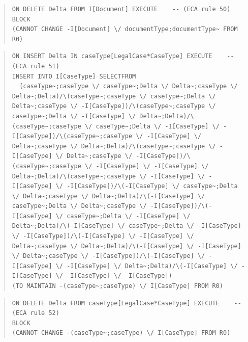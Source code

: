 \documentclass[10pt,a4paper]{report}              %
\theoremstyle{plain}\theorembodyfont{\rmfamily}\newtheorem{definition}{Definition}[section]
\theoremstyle{plain}\theorembodyfont{\rmfamily}\newtheorem{designrule}[definition]{Requirement}
\begin{document}
\begin{quote}
\begin{verbatim}
ON DELETE Delta FROM I[Document] EXECUTE    -- (ECA rule 50)
BLOCK
(CANNOT CHANGE -I[Document] \/ documentType;documentType~ FROM R0)
\end{verbatim}
\end{quote}
\begin{quote}
\begin{verbatim}
ON INSERT Delta IN caseType[LegalCase*CaseType] EXECUTE    -- (ECA rule 51)
INSERT INTO I[CaseType] SELECTFROM
  (caseType~;caseType \/ caseType~;Delta \/ Delta~;caseType \/ Delta~;Delta)/\(caseType~;caseType \/ caseType~;Delta \/ Delta~;caseType \/ -I[CaseType])/\(caseType~;caseType \/ caseType~;Delta \/ -I[CaseType] \/ Delta~;Delta)/\(caseType~;caseType \/ caseType~;Delta \/ -I[CaseType] \/ -I[CaseType])/\(caseType~;caseType \/ -I[CaseType] \/ Delta~;caseType \/ Delta~;Delta)/\(caseType~;caseType \/ -I[CaseType] \/ Delta~;caseType \/ -I[CaseType])/\(caseType~;caseType \/ -I[CaseType] \/ -I[CaseType] \/ Delta~;Delta)/\(caseType~;caseType \/ -I[CaseType] \/ -I[CaseType] \/ -I[CaseType])/\(-I[CaseType] \/ caseType~;Delta \/ Delta~;caseType \/ Delta~;Delta)/\(-I[CaseType] \/ caseType~;Delta \/ Delta~;caseType \/ -I[CaseType])/\(-I[CaseType] \/ caseType~;Delta \/ -I[CaseType] \/ Delta~;Delta)/\(-I[CaseType] \/ caseType~;Delta \/ -I[CaseType] \/ -I[CaseType])/\(-I[CaseType] \/ -I[CaseType] \/ Delta~;caseType \/ Delta~;Delta)/\(-I[CaseType] \/ -I[CaseType] \/ Delta~;caseType \/ -I[CaseType])/\(-I[CaseType] \/ -I[CaseType] \/ -I[CaseType] \/ Delta~;Delta)/\(-I[CaseType] \/ -I[CaseType] \/ -I[CaseType] \/ -I[CaseType])
(TO MAINTAIN -(caseType~;caseType) \/ I[CaseType] FROM R0)
\end{verbatim}
\end{quote}
\begin{quote}
\begin{verbatim}
ON DELETE Delta FROM caseType[LegalCase*CaseType] EXECUTE    -- (ECA rule 52)
BLOCK
(CANNOT CHANGE -(caseType~;caseType) \/ I[CaseType] FROM R0)
\end{verbatim}
\end{quote}
\end{document}
